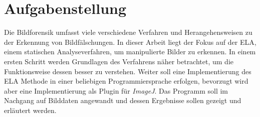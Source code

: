 \section{Aufgabenstellung}
Die Bildforensik umfasst viele verschiedene Verfahren und Herangehensweisen zu der Erkennung von Bildfälschungen. In dieser Arbeit liegt der Fokus auf der \ac{ELA}, einem statischen Analyseverfahren, um manipulierte Bilder zu erkennen. In einem ersten Schritt werden Grundlagen des Verfahrens näher betrachtet, um die Funktionsweise dessen besser zu verstehen.
Weiter soll eine Implementierung des \acl{ELA} Methode in einer beliebigen Programmiersprache erfolgen, bevorzugt wird aber eine Implementierung als Plugin für \textit{ImageJ}.
Das Programm soll im Nachgang auf Bilddaten angewandt und dessen Ergebnisse sollen gezeigt und erläutert werden.


